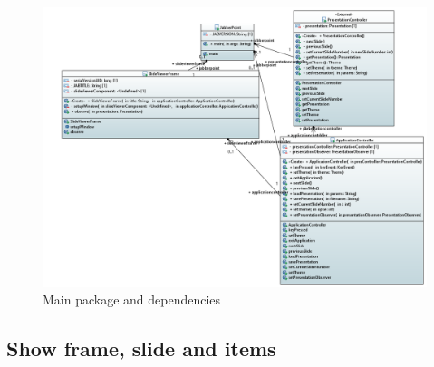 \documentclass[a4paper]{article}
\begin{document}
\begin{figure}[!htpb]
  \includegraphics[width=\linewidth]{Main.png}
  \caption{Main package and dependencies}
  \label{fig:packdiag}
\end{figure}
\subsection{Show frame, slide and items}
\end{document}
